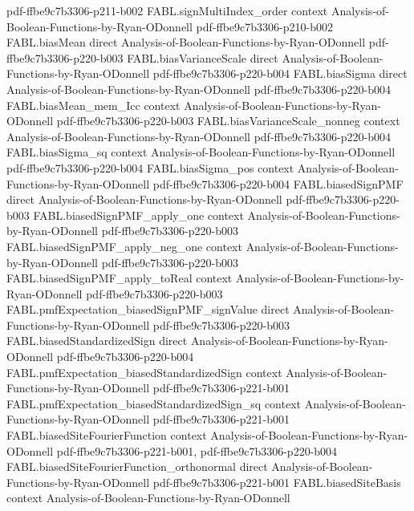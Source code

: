 \begin{theorem}
  {pdf-ffbe9c7b3306-p211-b002}
\proofstep
  {FABL.signMultiIndex_order}
  {context}
  {Analysis-of-Boolean-Functions-by-Ryan-ODonnell}
  {pdf-ffbe9c7b3306-p210-b002}
\proofstep
  {FABL.biasMean}
  {direct}
  {Analysis-of-Boolean-Functions-by-Ryan-ODonnell}
  {pdf-ffbe9c7b3306-p220-b003}
\proofstep
  {FABL.biasVarianceScale}
  {direct}
  {Analysis-of-Boolean-Functions-by-Ryan-ODonnell}
  {pdf-ffbe9c7b3306-p220-b004}
\proofstep
  {FABL.biasSigma}
  {direct}
  {Analysis-of-Boolean-Functions-by-Ryan-ODonnell}
  {pdf-ffbe9c7b3306-p220-b004}
\proofstep
  {FABL.biasMean_mem_Icc}
  {context}
  {Analysis-of-Boolean-Functions-by-Ryan-ODonnell}
  {pdf-ffbe9c7b3306-p220-b003}
\proofstep
  {FABL.biasVarianceScale_nonneg}
  {context}
  {Analysis-of-Boolean-Functions-by-Ryan-ODonnell}
  {pdf-ffbe9c7b3306-p220-b004}
\proofstep
  {FABL.biasSigma_sq}
  {context}
  {Analysis-of-Boolean-Functions-by-Ryan-ODonnell}
  {pdf-ffbe9c7b3306-p220-b004}
\proofstep
  {FABL.biasSigma_pos}
  {context}
  {Analysis-of-Boolean-Functions-by-Ryan-ODonnell}
  {pdf-ffbe9c7b3306-p220-b004}
\proofstep
  {FABL.biasedSignPMF}
  {direct}
  {Analysis-of-Boolean-Functions-by-Ryan-ODonnell}
  {pdf-ffbe9c7b3306-p220-b003}
\proofstep
  {FABL.biasedSignPMF_apply_one}
  {context}
  {Analysis-of-Boolean-Functions-by-Ryan-ODonnell}
  {pdf-ffbe9c7b3306-p220-b003}
\proofstep
  {FABL.biasedSignPMF_apply_neg_one}
  {context}
  {Analysis-of-Boolean-Functions-by-Ryan-ODonnell}
  {pdf-ffbe9c7b3306-p220-b003}
\proofstep
  {FABL.biasedSignPMF_apply_toReal}
  {context}
  {Analysis-of-Boolean-Functions-by-Ryan-ODonnell}
  {pdf-ffbe9c7b3306-p220-b003}
\proofstep
  {FABL.pmfExpectation_biasedSignPMF_signValue}
  {direct}
  {Analysis-of-Boolean-Functions-by-Ryan-ODonnell}
  {pdf-ffbe9c7b3306-p220-b003}
\proofstep
  {FABL.biasedStandardizedSign}
  {direct}
  {Analysis-of-Boolean-Functions-by-Ryan-ODonnell}
  {pdf-ffbe9c7b3306-p220-b004}
\proofstep
  {FABL.pmfExpectation_biasedStandardizedSign}
  {context}
  {Analysis-of-Boolean-Functions-by-Ryan-ODonnell}
  {pdf-ffbe9c7b3306-p221-b001}
\proofstep
  {FABL.pmfExpectation_biasedStandardizedSign_sq}
  {context}
  {Analysis-of-Boolean-Functions-by-Ryan-ODonnell}
  {pdf-ffbe9c7b3306-p221-b001}
\proofstep
  {FABL.biasedSiteFourierFunction}
  {context}
  {Analysis-of-Boolean-Functions-by-Ryan-ODonnell}
  {pdf-ffbe9c7b3306-p221-b001,
    pdf-ffbe9c7b3306-p220-b004}
\proofstep
  {FABL.biasedSiteFourierFunction_orthonormal}
  {direct}
  {Analysis-of-Boolean-Functions-by-Ryan-ODonnell}
  {pdf-ffbe9c7b3306-p221-b001}
\proofstep
  {FABL.biasedSiteBasis}
  {context}
  {Analysis-of-Boolean-Functions-by-Ryan-ODonnell}

\end{theorem}
